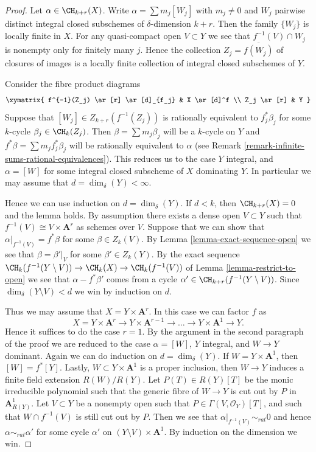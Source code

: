 \begin{proof}
Let $\alpha \in \CH_{k + r}(X)$.
Write $\alpha = \sum m_j[W_j]$ with $m_j \not = 0$ and
$W_j$ pairwise distinct integral closed subschemes of
$\delta$-dimension $k + r$. Then the family $\{W_j\}$
is locally finite in $X$. For any quasi-compact open
$V \subset Y$ we see that $f^{-1}(V) \cap W_j$
is nonempty only for finitely many $j$. Hence the
collection $Z_j = \overline{f(W_j)}$ of closures
of images is a locally finite collection of integral
closed subschemes of $Y$.

\medskip\noindent
Consider the fibre product diagrams
$$
\xymatrix{
f^{-1}(Z_j) \ar[r] \ar[d]_{f_j} & X \ar[d]^f \\
Z_j \ar[r] & Y
}
$$
Suppose that $[W_j] \in Z_{k + r}(f^{-1}(Z_j))$
is rationally equivalent to $f_j^*\beta_j$ for some
$k$-cycle $\beta_j \in \CH_k(Z_j)$. Then
$\beta = \sum m_j \beta_j$ will be a $k$-cycle on $Y$
and $f^*\beta = \sum m_j f_j^*\beta_j$ will be rationally
equivalent to $\alpha$ (see
Remark \ref{remark-infinite-sums-rational-equivalences}).
This reduces us to the case $Y$ integral, and
$\alpha = [W]$ for some integral closed subscheme
of $X$ dominating $Y$. In particular we may
assume that $d = \dim_\delta(Y) < \infty$.

\medskip\noindent
Hence we can use induction on $d = \dim_\delta(Y)$.
If $d < k$, then $\CH_{k + r}(X) = 0$ and the lemma holds.
By assumption there exists a dense open $V \subset Y$ such
that $f^{-1}(V) \cong V \times \mathbf{A}^r$ as schemes over $V$.
Suppose that we can show that $\alpha|_{f^{-1}(V)} = f^*\beta$
for some $\beta \in Z_k(V)$. By Lemma \ref{lemma-exact-sequence-open}
we see that
$\beta = \beta'|_V$ for some $\beta' \in Z_k(Y)$.
By the exact sequence
$\CH_k(f^{-1}(Y \setminus V)) \to \CH_k(X) \to \CH_k(f^{-1}(V))$
of Lemma \ref{lemma-restrict-to-open}
we see that $\alpha - f^*\beta'$ comes from
a cycle $\alpha' \in \CH_{k + r}(f^{-1}(Y \setminus V))$.
Since $\dim_\delta(Y \setminus V) < d$ we win by
induction on $d$.

\medskip\noindent
Thus we may assume that $X = Y \times \mathbf{A}^r$.
In this case we can factor $f$ as
$$
X = Y \times \mathbf{A}^r \to
Y \times \mathbf{A}^{r - 1} \to \ldots \to
Y \times \mathbf{A}^1 \to Y.
$$
Hence it suffices to do the case $r = 1$. By the argument in the
second paragraph of the proof we are reduced to the case
$\alpha = [W]$, $Y$ integral, and $W \to Y$ dominant.
Again we can do induction on $d = \dim_\delta(Y)$.
If $W = Y \times \mathbf{A}^1$, then $[W] = f^*[Y]$.
Lastly, $W \subset Y \times \mathbf{A}^1$ is a proper inclusion,
then $W \to Y$ induces a finite field extension $R(W)/R(Y)$.
Let $P(T) \in R(Y)[T]$ be the monic irreducible polynomial such
that the generic fibre of $W \to Y$ is cut out by $P$ in
$\mathbf{A}^1_{R(Y)}$. Let $V \subset Y$ be a nonempty open such
that $P \in \Gamma(V, \mathcal{O}_Y)[T]$, and such that
$W \cap f^{-1}(V)$ is still cut out by $P$. Then we see that
$\alpha|_{f^{-1}(V)} \sim_{rat} 0$ and hence $\alpha \sim_{rat} \alpha'$
for some cycle $\alpha'$ on $(Y \setminus V) \times \mathbf{A}^1$.
By induction on the dimension we win.
\end{proof}

